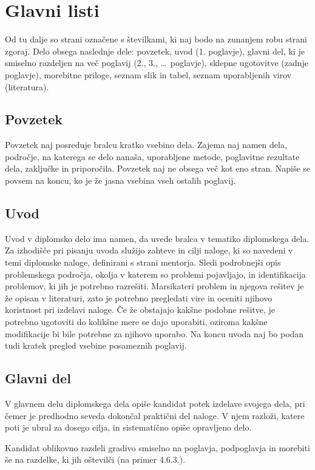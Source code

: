 \documentclass[12pt,a4paper,openany]{book}
\begin{document}
\section{Glavni listi}
Od tu dalje so strani označene s številkami, ki naj bodo na zunanjem robu strani zgoraj. 
Delo obsega naslednje dele: povzetek, uvod (1. poglavje), glavni del, ki je smiselno razdeljen na več poglavij (2., 3., \ldots\ poglavje),
sklepne ugotovitve (zadnje poglavje), morebitne priloge, seznam slik in tabel, seznam uporabljenih virov (literatura). 

\subsection{Povzetek}
Povzetek naj posreduje bralcu kratko vsebino dela. Zajema naj namen dela, področje, na katerega se delo nanaša,
uporabljene metode, poglavitne rezultate dela, zaključke in priporočila.  
Povzetek naj ne obsega več kot eno stran. Napiše se povsem na koncu, ko je že jasna vsebina vseh ostalih poglavij.

\subsection{Uvod}
Uvod v diplomsko delo ima namen, da uvede bralca v tematiko dip\-lom\-ske\-ga dela. Za izhodišče pri pisanju uvoda služijo zahteve
in cilji naloge, ki so navedeni v temi diplomske naloge, definirani s strani mentorja. Sledi podrobnejši opis problemskega področja, okolja v
katerem so problemi pojavljajo, in identifikacija problemov, ki jih je potrebno razrešiti. Marsikateri problem in njegova rešitev je že opisan
v literaturi, zato je potrebno pregledati vire in oceniti njihovo koristnost pri izdelavi naloge. Če že obstajajo kakšne podobne rešitve, je
potrebno ugotoviti do kolikšne mere se dajo uporabiti, oziroma kakšne modifikacije bi bile potrebne za njihovo uporabo.
Na koncu uvoda naj bo podan tudi kratek pregled vsebine posameznih poglavij.

\subsection{Glavni del}
V glavnem delu diplomskega dela opiše kandidat potek izdelave svojega dela, 
pri čemer je predhodno seveda dokončal praktični del naloge.  V njem razloži, katere poti je ubral za dosego cilja, in sistematično opiše
opravljeno delo.

Kandidat oblikovno razdeli gradivo smiselno na poglavja, podpoglavja in morebiti še na razdelke, ki jih oštevilči 
(na primer 4.6.3.). 
\end{document}
